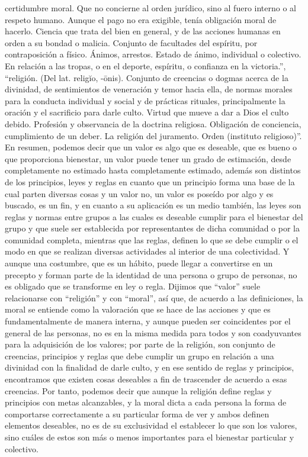 \documentclass[12pt]{book} %
\begin{document}
certidumbre moral. Que no concierne al orden jurídico, sino al fuero interno o al respeto humano. Aunque el pago no era exigible, tenía obligación moral de hacerlo. Ciencia que trata del bien en general, y de las acciones humanas en orden a su bondad o malicia. Conjunto de facultades del espíritu, por contraposición a físico. Ánimos, arrestos. Estado de ánimo, individual o colectivo. En relación a las tropas, o en el deporte, espíritu, o confianza en la victoria.”, “religión. (Del lat. religĭo, -ōnis). Conjunto de creencias o dogmas acerca de la divinidad, de sentimientos de veneración y temor hacia ella, de normas morales para la conducta individual y social y de prácticas rituales, principalmente la oración y el sacrificio para darle culto. Virtud que mueve a dar a Dios el culto debido. Profesión y observancia de la doctrina religiosa. Obligación de conciencia, cumplimiento de un deber. La religión del juramento. Orden (instituto religioso)”.\\

En resumen, podemos decir que un valor es algo que es deseable, que es bueno o que proporciona bienestar, un valor puede tener un grado de estimación, desde completamente no estimado hasta completamente estimado, además son distintos de los principios, leyes y reglas en cuanto que un principio forma una base de la cual parten diversas cosas y un valor no, un valor es poseído por algo y es buscado, es un fin, y en cuanto a su aplicación es un medio también, las leyes son reglas y normas entre grupos a las cuales es deseable cumplir para el bienestar del grupo y que suele ser establecida por representantes de dicha comunidad o por la comunidad completa, mientras que las reglas, definen lo que se debe cumplir o el modo en que se realizan diversas actividades al interior de una colectividad. Y aunque una costumbre, que es un hábito, puede llegar a convertirse en un precepto y forman parte de la identidad de una persona o grupo de personas, no es obligado que se transforme en ley o regla. Dijimos que “valor” suele relacionarse con “religión” y con “moral”, así que, de acuerdo a las definiciones, la moral se entiende como la valoración que se hace de las acciones y que es fundamentalmente de manera interna, y aunque pueden ser coincidentes por el general de las personas, no es en la misma medida para todos y son coadyuvantes para la adquisición de los valores; por parte de la religión, son conjunto de creencias, principios y reglas que debe cumplir un grupo en relación a una divinidad con la finalidad de darle culto, y en ese sentido de reglas y principios, encontramos que existen cosas deseables a fin de trascender de acuerdo a esas creencias. Por tanto, podemos decir que aunque la religión define reglas y principios con metas alcanzables, y la moral dicta a cada persona la forma de comportarse correctamente a su particular forma de ver y ambos definen elementos deseables, no es de su exclusividad el establecer lo que son los valores, sino cuáles de estos son más o menos importantes para el bienestar particular y colectivo.\\
\end{document}
